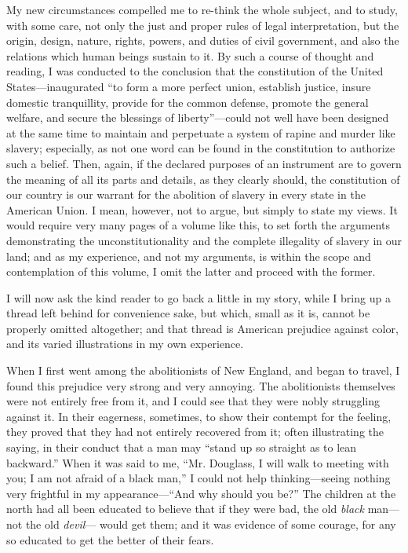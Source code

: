 My new circumstances compelled me to re-think the whole subject, and to
study, with some care, not only the just and proper rules of legal
interpretation, but the origin, design, nature, rights, powers, and
duties of civil government, and also the relations which human beings
sustain to it. By such a course of thought and reading, I was conducted
to the conclusion that the constitution of the United
States---inaugurated ``to form a more perfect union, establish justice,
insure domestic tranquillity, provide for the common defense, promote
the general welfare, and secure the blessings of liberty''---could not
well have been designed at the same time to maintain and perpetuate a
system of rapine and murder like slavery; especially, as not one word
can be found in the constitution to authorize such a belief. Then,
again, if the declared purposes of an instrument are to govern the
meaning of all its parts and details, as they clearly
{\protect\hypertarget{398}{}{}}should, the constitution of our country
is our warrant for the abolition of slavery in every state in the
American Union. I mean, however, not to argue, but simply to state my
views. It would require very many pages of a volume like this, to set
forth the arguments demonstrating the unconstitutionality and the
complete illegality of slavery in our land; and as my experience, and
not my arguments, is within the scope and contemplation of this volume,
I omit the latter and proceed with the former.

I will now ask the kind reader to go back a little in my story, while I
bring up a thread left behind for convenience sake, but which, small as
it is, cannot be properly omitted altogether; and that thread is
American prejudice against color, and its varied illustrations in my own
experience.

When I first went among the abolitionists of New England, and began to
travel, I found this prejudice very strong and very annoying. The
abolitionists themselves were not entirely free from it, and I could see
that they were nobly struggling against it. In their eagerness,
sometimes, to show their contempt for the feeling, they proved that they
had not entirely recovered from it; often illustrating the saying, in
their conduct that a man may ``stand up so straight as to lean
backward.'' When it was said to me, ``Mr. Douglass, I will walk to
meeting with you; I am not afraid of a black man,'' I could not help
thinking---seeing nothing very frightful in my appearance---``And why
should you be?'' The children at the north had all been educated to
believe that if they were bad, the old \emph{black} man---not the old
\emph{devil}--- {\protect\hypertarget{399}{}{}}would get them; and it
was evidence of some courage, for any so educated to get the better of
their fears.

